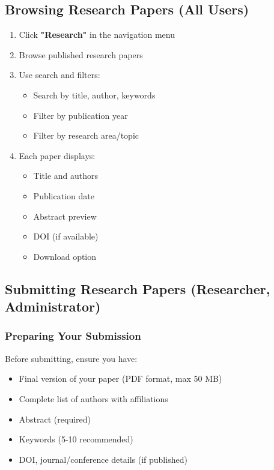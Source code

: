 \documentclass[12pt,a4paper]{article}
\begin{document}
\subsection{Browsing Research Papers (All Users)}
\begin{enumerate}[leftmargin=*]
    \item Click \textbf{"Research"} in the navigation menu
    \item Browse published research papers
    \item Use search and filters:
        \begin{itemize}
            \item Search by title, author, keywords
            \item Filter by publication year
            \item Filter by research area/topic
        \end{itemize}
    \item Each paper displays:
        \begin{itemize}
            \item Title and authors
            \item Publication date
            \item Abstract preview
            \item DOI (if available)
            \item Download option
        \end{itemize}
\end{enumerate}

\subsection{Submitting Research Papers (Researcher, Administrator)}

\subsubsection{Preparing Your Submission}
Before submitting, ensure you have:
\begin{itemize}[leftmargin=*]
    \item Final version of your paper (PDF format, max 50 MB)
    \item Complete list of authors with affiliations
    \item Abstract (required)
    \item Keywords (5-10 recommended)
    \item DOI, journal/conference details (if published)
\end{itemize}
\end{document}
